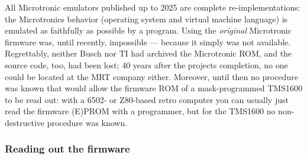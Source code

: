 \documentclass[
  11pt,
  letterpaper,
]{article}
\begin{document}
All Microtronic emulators published up to 2025 are complete
re-implementations: the Microtronic\textquotesingle s behavior
(operating system and virtual machine language) is emulated as
faithfully as possible by a program. Using the \emph{original}
Microtronic firmware was, until recently, impossible --- because it
simply was not available. Regrettably, neither Busch nor TI had archived
the Microtronic ROM, and the source code, too, had been lost; 40 years
after the project\textquotesingle s completion, no one could be located
at the MRT company either. Moreover, until then no procedure was known
that would allow the firmware ROM of a mask-programmed TMS1600 to be
read out: with a 6502- or Z80-based retro computer you can usually just
read the firmware (E)PROM with a programmer, but for the TMS1600 no
non-destructive procedure was known.

\subsubsection{Reading out the firmware}\label{reading-out-the-firmware}
\end{document}
